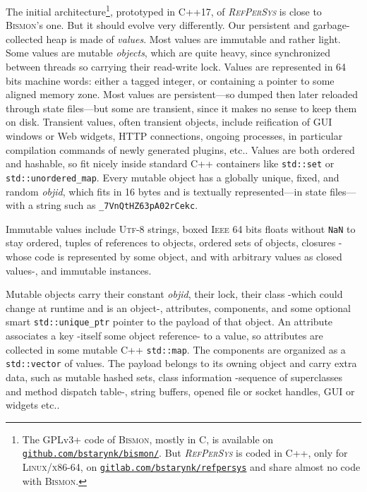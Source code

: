 \documentclass{ecai}
\newcommand{\RefPerSys}{{\textit{\textsc{RefPerSys}}}}
\begin{document}
The initial architecture\footnote{The GPLv3+ code of \textsc{Bismon},
mostly in C, is available on
\href{https://github.com/bstarynk/bismon/}{\texttt{github.com/bstarynk/bismon/}}. But
     {\RefPerSys} is coded in C++, only for \textsc{Linux/x86-64}, on
     \href{https://gitlab.com/bstarynk/refpersys}{\texttt{gitlab.com/bstarynk/refpersys}}
     and share almost no code with \textsc{Bismon}.}, prototyped in
C++17, of {\RefPerSys} is close to \textsc{Bismon}'s one. But it
should evolve very differently. Our persistent and garbage-collected
\cite{jones:2016:gchandbook} heap is made of \emph{values}. Most
values are immutable and rather light. Some values are mutable
\emph{objects}, which are quite heavy, since synchronized between
threads so carrying their read-write lock. Values are represented in
64 bits machine words: either a tagged integer, or containing a
pointer to some aligned memory zone. Most values are persistent---so
dumped then later reloaded through state files---but some are transient,
since it makes no sense to keep them on disk. Transient values, often
transient objects, include reification of GUI windows or Web widgets,
HTTP connections, ongoing processes, in particular compilation
commands of newly generated plugins, etc.. Values are both ordered
and hashable, so fit nicely inside standard C++ containers like
\texttt{std::set} or \texttt{std::unordered\_map}. Every mutable
object has a globally unique, fixed, and random \emph{objid}, which
fits in 16 bytes and is textually represented---in state files---with a
string such as \texttt{\_7VnQtHZ63pA02rCekc}.

Immutable values include \textsc{Utf-8} strings, boxed \textsc{Ieee}
64 bits floats without \texttt{NaN} to stay ordered, tuples of
references to objects, ordered sets of objects, closures -whose code
is represented by some object, and with arbitrary values as closed
values-, and immutable instances.

Mutable objects carry their constant \emph{objid}, their lock, their
class -which could change at runtime and is an object-, attributes,
components, and some optional smart \texttt{std::unique\_ptr} pointer
to the payload of that object. An attribute associates a key -itself
some object reference- to a value, so attributes are collected in some
mutable C++ \texttt{std::map}. The components are organized as a
\texttt{std::vector} of values. The payload belongs to its owning
object and carry extra data, such as mutable hashed sets, class
information -sequence of superclasses and method dispatch table-,
string buffers, opened file or socket handles, GUI or widgets etc..
\end{document}
